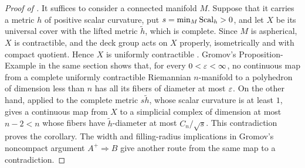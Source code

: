 \begin{proof}[Proof of ]
It suffices to consider a connected manifold \(M\). Suppose that it
carries a metric \(h\) of positive scalar curvature, put
\(s=\min_M\operatorname{Scal}_h>0\), and let \(X\) be its universal cover with the
lifted metric \(\widetilde h\), which is complete. Since \(M\) is
aspherical, \(X\) is contractible, and the deck group acts on \(X\)
properly, isometrically and with compact quotient. Hence \(X\) is
uniformly contractible \citep[\S\(2\frac12\)]{gromov1996}. Gromov's
Proposition-Example in the same section shows that, for every
\(0<\varepsilon<\infty\), no continuous map from a complete uniformly
contractible Riemannian \(n\)-manifold to a polyhedron of dimension
less than \(n\) has all its fibers of diameter at most \(\varepsilon\). On the other
hand,  applied to the complete metric \(s\widetilde h\),
whose scalar curvature is at least \(1\), gives a continuous map from
\(X\) to a simplicial complex of dimension at most \(n-2<n\) whose
fibers have \(\widetilde h\)-diameter at most \(C_n/\sqrt s\). This
contradiction proves the corollary. The width and filling-radius
implications in Gromov's noncompact argument \(A^+\Rightarrow B\)
\citep[\S3, pp.~6--8]{gromov2017Dozen} give another route from the same
map to a contradiction.
\end{proof}
